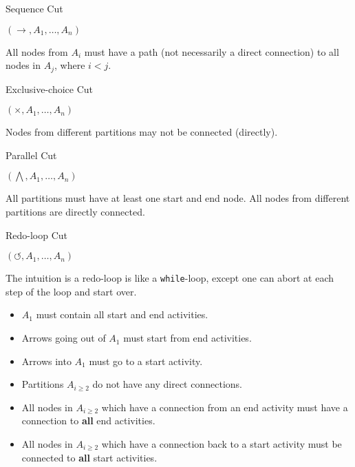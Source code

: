 \documentclass[english]{panikzettel}
\begin{document}
\begin{halfboxl}
    \vspace{0\baselineskip}
    \begin{defi}{Sequence Cut}
        \begin{tightcenter}\large{}$(\rightarrow, A_1, \ldots, A_n)$\end{tightcenter}

        All nodes from $A_i$ must have a path (not necessarily a direct connection) to all nodes in $A_j$, where $i < j$.
    \end{defi}

    \begin{defi}{Exclusive-choice Cut}
        \begin{tightcenter}\large{}$(\times, A_1, \ldots, A_n)$\end{tightcenter}

        Nodes from different partitions may not be connected (directly).
    \end{defi}

    \begin{defi}{Parallel Cut}
        \begin{tightcenter}\large{}$(\bigwedge, A_1, \ldots, A_n)$\end{tightcenter}

        All partitions must have at least one start and end node.
        All nodes from different partitions are directly connected.
    \end{defi}
\end{halfboxl}%
\begin{halfboxr}
    \vspace{0\baselineskip}
    \begin{defi}{Redo-loop Cut}
        \begin{tightcenter}\large{}$(\circlearrowleft, A_1, \ldots, A_n)$\end{tightcenter}

        The intuition is a redo-loop is like a \texttt{while}-loop, except one can abort at each step of the loop and start over.
        \begin{itemize}[leftmargin=*]
            \item $A_1$ must contain all start and end activities.
            \item Arrows going out of $A_1$ must start from end activities.
            \item Arrows into $A_1$ must go to a start activity.
            \item Partitions $A_{i \geq 2}$ do not have any direct connections.
            \item All nodes in $A_{i \geq 2}$ which have a connection from an end activity must have a connection to \textbf{all} end activities.
            \item All nodes in $A_{i \geq 2}$ which have a connection back to a start activity must be connected to \textbf{all} start activities.
        \end{itemize}
    \end{defi}
\end{halfboxr}
\end{document}
